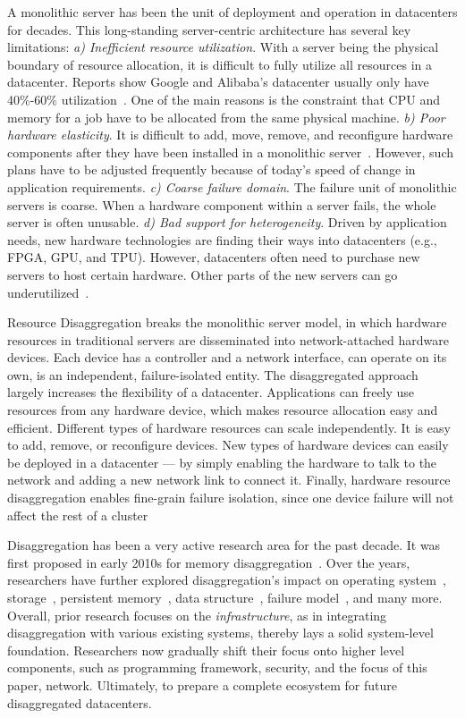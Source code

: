 A monolithic server has been the unit of deployment and operation
in datacenters for decades. This long-standing server-centric architecture
has several key limitations:
\textit{a) Inefficient resource utilization}. With a server being the physical
boundary of resource allocation, it is difficult to fully utilize all resources
in a datacenter. Reports show Google and Alibaba's datacenter usually only
have 40\%-60\% utilization~\cite{legoOS,Borg-eurosys20}. One of the main
reasons is the constraint that CPU and memory for a job have to be allocated
from the same physical machine.
\textit{b) Poor hardware elasticity}.
It is difficult to add, move, remove, and reconfigure
hardware components after they have been installed in
a monolithic server~\cite{FB-Wedge100}.
However, such plans have to be adjusted frequently because of
today's speed of change in application requirements.
\textit{c) Coarse failure domain}.
The failure unit of monolithic servers is coarse.
When a hardware component within a server fails, the whole
server is often unusable.
\textit{d) Bad support for heterogeneity}.
Driven by application needs, new hardware technologies
are finding their ways into datacenters (e.g., FPGA, GPU, and TPU).
However, datacenters often need to purchase
new servers to host certain hardware.
Other parts of the new servers can go underutilized~\cite{legoOS}.

Resource Disaggregation breaks the monolithic server model,
in which hardware resources in traditional servers are disseminated
into network-attached hardware devices.
Each device has a controller and a network interface,
can operate on its own, is an independent, failure-isolated entity.
The disaggregated approach largely increases the flexibility of a datacenter.
Applications can freely use resources from any hardware device,
which makes resource allocation easy and efficient.
Different types of hardware resources can scale independently.
It is easy to add, remove, or reconfigure devices.
New types of hardware devices can easily be deployed in a datacenter
— by simply enabling the hardware to talk to the network and adding a
new network link to connect it.
Finally, hardware resource disaggregation enables fine-grain failure isolation,
since one device failure will not affect the rest of a cluster

Disaggregation has been a very active research area for the past decade.
It was first proposed in early 2010s for memory disaggregation~\cite{Lim09-disaggregate}.
Over the years, researchers have further explored
disaggregation's impact on
operating system~\cite{legoOS}, storage~\cite{snowflake-nsdi20},
persistent memory~\cite{ATC20-pDPM},
data structure~\cite{aifm-osdi20},
failure model~\cite{disaggregation-hotcloud20}, and many more.
Overall, prior research focuses on the \textit{infrastructure},
as in integrating disaggregation with various existing systems,
thereby lays a solid system-level foundation.
Researchers now gradually shift their focus onto higher level components,
such as programming framework, security, and the focus of this paper, network.
Ultimately, to prepare a complete ecosystem for future disaggregated datacenters.

